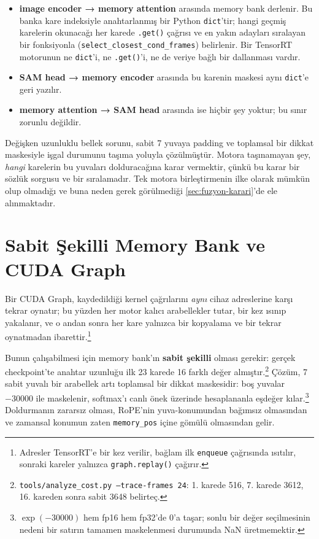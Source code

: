 \begin{itemize}
  \item \textbf{image encoder → memory attention} arasında memory bank
        derlenir. Bu banka kare indeksiyle anahtarlanmış bir Python
        \texttt{dict}'tir; hangi geçmiş karelerin okunacağı her karede
        \texttt{.get()} çağrısı ve en yakın adayları sıralayan bir
        fonksiyonla (\texttt{select\_closest\_cond\_frames}) belirlenir.
        Bir TensorRT motorunun ne \texttt{dict}'i, ne \texttt{.get()}'i,
        ne de veriye bağlı bir dallanması vardır.
  \item \textbf{SAM head → memory encoder} arasında bu karenin maskesi
        aynı \texttt{dict}'e geri yazılır.
  \item \textbf{memory attention → SAM head} arasında ise hiçbir şey
        yoktur; bu sınır zorunlu değildir.
\end{itemize}

Değişken uzunluklu bellek sorunu, sabit 7 yuvaya padding ve toplamsal
bir dikkat maskesiyle işgal durumunu taşıma yoluyla çözülmüştür. Motora
taşınamayan şey, \emph{hangi} karelerin bu yuvaları dolduracağına karar
vermektir, çünkü bu karar bir sözlük sorgusu ve bir sıralamadır. Tek
motora birleştirmenin ilke olarak mümkün olup olmadığı ve buna neden
gerek görülmediği \cref{sec:fuzyon-karari}'de ele alınmaktadır.

\section{Sabit Şekilli Memory Bank ve CUDA Graph}

Bir CUDA Graph, kaydedildiği kernel çağrılarını \emph{aynı} cihaz
adreslerine karşı tekrar oynatır; bu yüzden her motor kalıcı arabellekler
tutar, bir kez ısınıp yakalanır, ve o andan sonra her kare yalnızca bir
kopyalama ve bir tekrar oynatmadan ibarettir.\footnote{Adresler
TensorRT'e bir kez verilir, bağlam ilk \texttt{enqueue} çağrısında
ısıtılır, sonraki kareler yalnızca \texttt{graph.replay()} çağırır.}

Bunun çalışabilmesi için memory bank'ın \textbf{sabit şekilli} olması
gerekir: gerçek checkpoint'te anahtar uzunluğu ilk 23 karede 16 farklı
değer almıştır.\footnote{\texttt{tools/analyze\_cost.py
--trace-frames 24}: 1. karede 516, 7. karede 3612, 16. kareden sonra
sabit 3648 belirteç.} Çözüm, 7 sabit yuvalı bir arabellek artı
toplamsal bir dikkat maskesidir: boş yuvalar $-30000$ ile maskelenir,
softmax'ı canlı önek üzerinde hesaplananla eşdeğer kılar.\footnote{$\exp(-30000)$
hem fp16 hem fp32'de 0'a taşar; sonlu bir değer seçilmesinin nedeni bir
satırın tamamen maskelenmesi durumunda NaN üretmemektir.} Doldurmanın
zararsız olması, RoPE'nin yuva-konumundan bağımsız olmasından ve
zamansal konumun zaten \texttt{memory\_pos} içine gömülü olmasından gelir.

